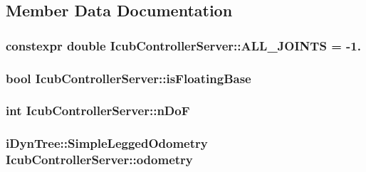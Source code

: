 \subsection{\-Member \-Data \-Documentation}
\hypertarget{classIcubControllerServer_a8d077d5e0d0fe0107e6f4f151bd03f2c}{
\subsubsection[{\-A\-L\-L\-\_\-\-J\-O\-I\-N\-T\-S}]{\setlength{\rightskip}{0pt plus 5cm}constexpr double {\bf \-Icub\-Controller\-Server\-::\-A\-L\-L\-\_\-\-J\-O\-I\-N\-T\-S} = -\/1.}}\label{classIcubControllerServer_a8d077d5e0d0fe0107e6f4f151bd03f2c}
\hypertarget{classIcubControllerServer_aebc2019921c3eabb53c01012fbd2355a}{
\subsubsection[{is\-Floating\-Base}]{\setlength{\rightskip}{0pt plus 5cm}bool {\bf \-Icub\-Controller\-Server\-::is\-Floating\-Base}}}\label{classIcubControllerServer_aebc2019921c3eabb53c01012fbd2355a}
\hypertarget{classIcubControllerServer_ab5fb1f18775cfe3036894c73dc21ebcf}{
\subsubsection[{n\-Do\-F}]{\setlength{\rightskip}{0pt plus 5cm}int {\bf \-Icub\-Controller\-Server\-::n\-Do\-F}}}\label{classIcubControllerServer_ab5fb1f18775cfe3036894c73dc21ebcf}
\hypertarget{classIcubControllerServer_ad0484106ab9d7fd42e2bd682338871c7}{
\subsubsection[{odometry}]{\setlength{\rightskip}{0pt plus 5cm}i\-Dyn\-Tree\-::\-Simple\-Legged\-Odometry {\bf \-Icub\-Controller\-Server\-::odometry}}}\label{classIcubControllerServer_ad0484106ab9d7fd42e2bd682338871c7}
